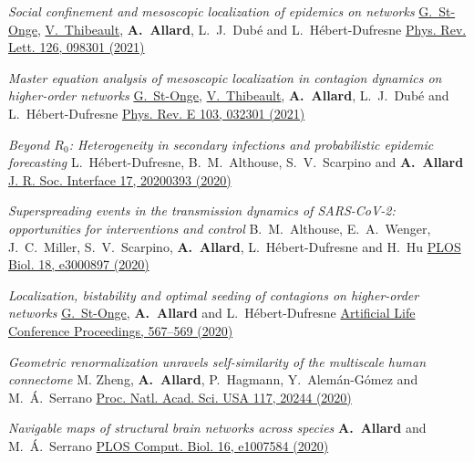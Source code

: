 \documentclass[11pt]{article}
\makeatletter
\newcommand{\reversearabic}[1]{\expandafter\@reversearabic\csname c@#1\endcsname}
\newcommand{\@reversearabic}[1]{%
  \number\numexpr\getrefnumber{this@etaremune@\romannumeral\c@etaremune}-#1+1\relax
}
\newcounter{etaremune}
\newenvironment{etaremune}[1][]{%
  \stepcounter{etaremune}%
  \begin{enumerate}[label=\reversearabic*.,#1]%
}{%
  \edef\@currentlabel{\the\csname c@\@enumctr\endcsname}%
  \label{this@etaremune@\romannumeral\c@etaremune}%
  \end{enumerate}%
}
\makeatother
\begin{document}
\begin{etaremune}[itemsep=0.5em, label={[A\reversearabic*]}]
%
  \item \parbox[t]{\textwidth-30pt}{\textit{Social confinement and mesoscopic localization of epidemics on networks}\split
  \uline{G.~St-Onge}, \uline{V.~Thibeault}, \textbf{A.~Allard}, L.~J.~Dub\'e and L.~H\'ebert-Dufresne\split
  \href{http://doi.org/10.1103/PhysRevLett.126.098301}{Phys. Rev. Lett. 126, 098301 (2021)}}
%
  \item \parbox[t]{\textwidth-30pt}{\textit{Master equation analysis of mesoscopic localization in contagion dynamics on higher-order networks}\split
  \uline{G.~St-Onge}, \uline{V.~Thibeault}, \textbf{A.~Allard}, L.~J.~Dub\'e and L.~H\'ebert-Dufresne\split
  \href{http://doi.org/10.1103/PhysRevE.103.032301}{Phys. Rev. E 103, 032301 (2021)}}
  \item \parbox[t]{\textwidth-30pt}{\textit{Beyond $R_0$: Heterogeneity in secondary infections and probabilistic epidemic forecasting}\split
  L.~H\'ebert-Dufresne, B.~M.~Althouse, S.~V.~Scarpino and \textbf{A.~Allard}\split
  \href{https://doi.org/10.1098/rsif.2020.0393}{J. R. Soc. Interface 17, 20200393 (2020)}}
%
  \item \parbox[t]{\textwidth-30pt}{\textit{Superspreading events in the transmission dynamics of SARS-CoV-2: opportunities for interventions and control}\split
  B.~M.~Althouse, E.~A.~Wenger, J.~C.~Miller, S.~V.~Scarpino, \textbf{A.~Allard}, L.~H\'ebert-Dufresne and H.~Hu\split
  \href{https://doi.org/10.1371/journal.pbio.3000897}{PLOS Biol. 18, e3000897 (2020)}}
%
  \item \parbox[t]{\textwidth-30pt}{\textit{Localization, bistability and optimal seeding of contagions on higher-order networks}\split
  \uline{G.~St-Onge}, \textbf{A.~Allard} and L.~H\'ebert-Dufresne\split
  \href{https://doi.org/10.1162/isal_a_00327}{Artificial Life Conference Proceedings, 567--569 (2020)}}
%
  \item \parbox[t]{\textwidth-30pt}{\textit{Geometric renormalization unravels self-similarity of the multiscale human connectome}\split
  M. Zheng, \textbf{A.~Allard}, P.~Hagmann, Y.~Alem\'an-G\'omez and M.~\'A.~Serrano\split
  \href{http://doi.org/10.1073/pnas.1922248117}{Proc. Natl. Acad. Sci. USA 117, 20244 (2020)}}
%
  \item \parbox[t]{\textwidth-30pt}{\textit{Navigable maps of structural brain networks across species}\split
  \textbf{A.~Allard} and M.~\'A.~Serrano\split
  \href{https://doi.org/10.1371/journal.pcbi.1007584}{PLOS Comput. Biol. 16, e1007584 (2020)}}

\end{etaremune}
\end{document}
